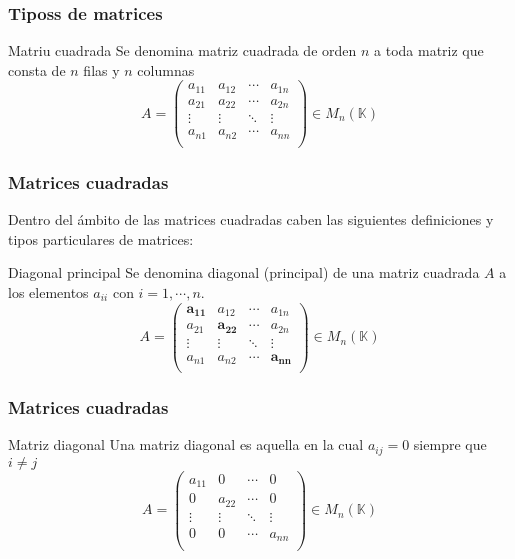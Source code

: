\documentclass[aspectratio=169]{beamer}
\begin{document}
 \begin{frame}
  \frametitle{Tiposs de matrices}
  \begin{block}{Matriu cuadrada}
Se denomina matriz cuadrada de orden $n$ a toda matriz que consta de $n$ filas y $n$ columnas
\[ A =  \left(\begin{matrix} %
      a_{11} & a_{12} & \cdots & a_{1n} \\
 a_{21} & a_{22} & \cdots & a_{2n} \\
  \vdots & \vdots & \ddots & \vdots \\
   a_{n1} & a_{n2} & \cdots & a_{nn} \\
    \end{matrix}\right) \in M_{ n} (\mathbb{K})\]
  \end{block}

  

 \end{frame}
 
 
  \begin{frame}
  \frametitle{Matrices cuadradas}
  
 Dentro del \'ambito de las matrices cuadradas caben las siguientes definiciones y tipos particulares de matrices:


  \begin{block}{Diagonal principal}
Se denomina diagonal (principal) de una matriz cuadrada $A$ a los elementos $a_{ii}$ con $i=1,\cdots, n$.
\[ A =  \left(\begin{matrix} %
      \boldsymbol{a_{11}} & a_{12} & \cdots & a_{1n} \\
 a_{21} & \boldsymbol{a_{22}} & \cdots & a_{2n} \\
  \vdots & \vdots & \ddots & \vdots \\
   a_{n1} & a_{n2} & \cdots & \boldsymbol{a_{nn}} \\
    \end{matrix}\right) \in M_{ n} (\mathbb{K})\]
  \end{block}

 \end{frame}
 
   \begin{frame}
  \frametitle{Matrices cuadradas}
  

   \begin{block}{Matriz diagonal}
Una matriz diagonal es aquella en la cual $a_{ij} = 0$ siempre que $i\neq j $
\[ A =  \left(\begin{matrix} %
      a_{11} & 0 & \cdots & 0 \\
      0 & a_{22} & \cdots & 0 \\
  \vdots & \vdots & \ddots & \vdots \\
   0 & 0 & \cdots & a_{nn} \\
    \end{matrix}\right) \in M_{ n} (\mathbb{K})\]
  \end{block}

 \end{frame}
 
\end{document}
